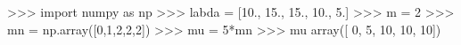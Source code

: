 
>>> import numpy as np
>>> labda = [10., 15., 15., 10., 5.]
>>> m = 2
>>> mn = np.array([0,1,2,2,2])
>>> mu = 5*mn
>>> mu
array([ 0,  5, 10, 10, 10])

